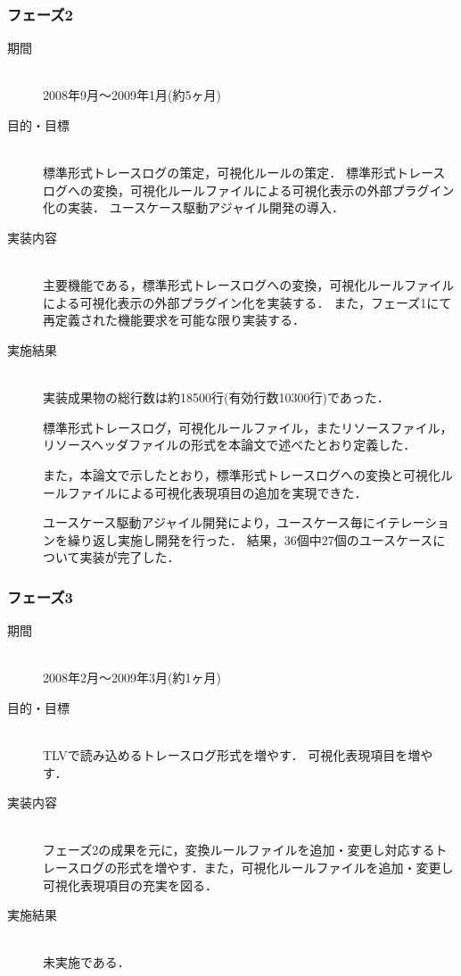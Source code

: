 \subsubsection{フェーズ2}

\begin{description}
\item[期間] \mbox{} \\
2008年9月～2009年1月(約5ヶ月)

\item[目的・目標] \mbox{} \\
標準形式トレースログの策定，可視化ルールの策定．
標準形式トレースログへの変換，可視化ルールファイルによる可視化表示の外部プラグイン化の実装．
ユースケース駆動アジャイル開発の導入．

\item[実装内容] \mbox{} \\
主要機能である，標準形式トレースログへの変換，可視化ルールファイルによる可視化表示の外部プラグイン化を実装する．
また，フェーズ1にて再定義された機能要求を可能な限り実装する．

\item[実施結果] \mbox{} \\
実装成果物の総行数は約18500行(有効行数10300行)であった．

標準形式トレースログ，可視化ルールファイル，またリソースファイル，リソースヘッダファイルの形式を本論文で述べたとおり定義した．

また，本論文で示したとおり，標準形式トレースログへの変換と可視化ルールファイルによる可視化表現項目の追加を実現できた．

ユースケース駆動アジャイル開発により，ユースケース毎にイテレーションを繰り返し実施し開発を行った．
結果，36個中27個のユースケースについて実装が完了した．

\end{description}

\subsubsection{フェーズ3}

\begin{description}
\item[期間] \mbox{} \\
2008年2月～2009年3月(約1ヶ月)

\item[目的・目標] \mbox{} \\
TLVで読み込めるトレースログ形式を増やす．
可視化表現項目を増やす．

\item[実装内容] \mbox{} \\
フェーズ2の成果を元に，変換ルールファイルを追加・変更し対応するトレースログの形式を増やす．また，可視化ルールファイルを追加・変更し可視化表現項目の充実を図る．

\item[実施結果] \mbox{} \\
未実施である．

\end{description}


